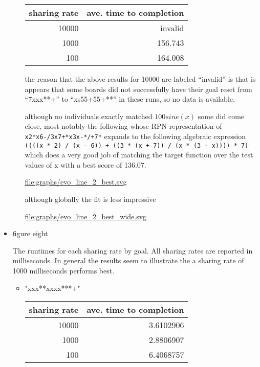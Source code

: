 \documentclass[11pt]{article}
\begin{document}
\begin{itemize}
\begin{itemize}
\begin{center}
\begin{tabular}{rr}
 sharing rate  &  ave. time to completion  \\
\hline
        10000  &                  invalid  \\
         1000  &                  156.743  \\
          100  &                  164.008  \\
\end{tabular}
\end{center}



the reason that the above results for 10000 are labeled ``invalid'' is
that is appears that some boards did not successfully have their goal
reset from ``7xxx**+'' to ``xs55+55+**'' in these runs, so no data is
available.

although no individuals exactly matched $100 sine(x)$ some did come
close, most notably the following whose RPN representation of
\texttt{x2*x6-/3x7+*x3x-*/+7*} expands to the following algebraic expression
\texttt{((((x * 2) / (x - 6)) + ((3 * (x + 7)) / (x * (3 - x)))) * 7)} which
does a very good job of matching the target function over the test
values of x with a best score of 136.07.



\href{file:///nfs/adaptive/eschulte/src/gp4ixm-report/graphs/evo_line_2_best.svg}{file:graphs/evo\_line\_2\_best.svg}

although globally the fit is less impressive



\href{file:///nfs/adaptive/eschulte/src/gp4ixm-report/graphs/evo_line_2_best_wide.svg}{file:graphs/evo\_line\_2\_best\_wide.svg}

\end{itemize} %

\item figure eight\\
\label{sec-1.5.3.2}

The runtimes for each sharing rate by goal.  All sharing rates are
reported in milliseconds.  In general the results seem to illustrate
the a sharing rate of 1000 milliseconds performs best.
\begin{itemize}

\item "xxx**xxxx***+"\\
\label{sec-1.5.3.2.1}


\begin{center}
\begin{tabular}{rr}
 sharing rate  &  ave. time to completion  \\
\hline
        10000  &                3.6102906  \\
         1000  &                2.8806907  \\
          100  &                6.4068757  \\
\end{tabular}
\end{center}





\end{itemize}
\end{itemize}
\end{document}

